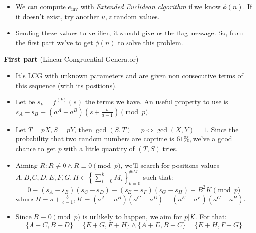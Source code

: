\documentclass[a0paper,portrait]{baposter}
\begin{document}
\begin{poster}
{\begin{itemize}
      \vspace{-1em}
      \begin{equation*}
        g^z \cdot h^e \equiv g^z \cdot \left((u \cdot g^{-z})^{e_\text{inv}}\right)^e \equiv g^z \cdot u \cdot g^{-z} \equiv u \pmod{n}
      \end{equation*}


      \vspace{-0.6em}
    \item We can compute $e_\text{inv}$ with \textit{Extended Euclidean algorithm} if we know
      $\phi(n)$.
      If it doesn't exist, try another $u,z$ random values.
    \item Sending these values to verifier, it should give us the flag message.
      So, from the first part we've to get $\phi(n)$ to solve this problem.
  \end{itemize}

  \vspace{-0.5em}
  \textbf{First part} (Linear Congruential Generator)

  \vspace{-0.5em}
  \begin{itemize}
    \item It's LCG with unknown parameters and are given non consecutive terms of
      this sequence (with its positions).
    \item Let be $s_k \! = \! f^{(k)}(s)$ the terms we have.
      An useful property to use is $s_A - s_B \equiv (a^A-a^B)\left(s+\frac{b}{a-1}\right)\pmod{p}$.
    \item Let $T \! = \! pX, S \! = \! pY$, then $\gcd(S,T) \! = \! p \! \iff \! \gcd(X,Y) \! = \! 1$.
      Since the probability that two random numbers are coprime is $61\%$,
      we've a good chance to get $p$ with a little quantity of $(T,S)$ tries.
    \item Aiming $R : R \! \neq \! 0 \land R \! \equiv \! 0 \pmod{p}$,
      we'll search for positions values $A,B,C,D,E,F,G,H \in \left\{\sum_{i=0}^k M_i\right\}_{k=0}^{\# M}$ such that:
      \begin{equation*}
          0 \equiv (s_A-s_B)(s_C-s_D)-(s_E-s_F)(s_G-s_H)
            \equiv B^2 K\pmod{p}
      \end{equation*}
      where $B = s+\frac{b}{a-1}, K = (a^A-a^B)(a^C-a^D)-(a^E-a^F)(a^G-a^H)$.
    \item Since $B \equiv 0 \pmod{p}$ is unlikely to happen, we aim for $p|K$. For that:
      \begin{equation*}
        \{A+C,B+D\} = \{E+G,F+H\} \land \{A+D,B+C\} = \{E+H,F+G\}
      \end{equation*}


\end{itemize}}
\end{poster}
\end{document}

